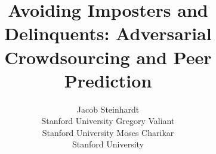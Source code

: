 \documentclass{article}
\title{Avoiding Imposters and Delinquents: Adversarial Crowdsourcing and Peer Prediction}
\author{
  Jacob Steinhardt \\
  Stanford University %
\And
	Gregory Valiant \\
  Stanford University %
\And
	Moses Charikar \\
  Stanford University %
}
\begin{document}
\renewcommand{\paragraph}[1]{\textbf{#1}}

\maketitle

\begin{abstract}

\end{abstract}
\setlength{\textfloatsep}{8pt}



%



%



{%
\sectionfont{\small}
\def\bibfont{\small}
\setlength{\baselineskip}{0pt}
\setlength{\bibsep}{0pt plus 0ex}

%

}




\appendix

%
%



\end{document}
